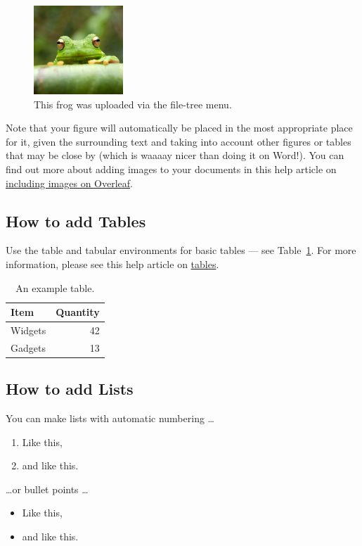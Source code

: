 \documentclass{article}
\begin{document}
\begin{figure}[tb]
\centering
\includegraphics[width=0.3\textwidth]{frog.jpg}
\caption{\label{fig:frog}This frog was uploaded via the file-tree menu.}
\end{figure}

Note that your figure will automatically be placed in the most appropriate place for it, given the surrounding text and taking into account other figures or tables that may be close by (which is waaaay nicer than doing it on Word!). You can find out more about adding images to your documents in this help article on \href{https://www.overleaf.com/learn/how-to/Including_images_on_Overleaf}{including images on Overleaf}.



\subsection{How to add Tables}

Use the table and tabular environments for basic tables --- see Table~\ref{tab:widgets}. For more information, please see this help article on \href{https://www.overleaf.com/learn/latex/tables}{tables}. 

\begin{table}[tb]
\centering
\begin{tabular}{l|r}
Item & Quantity \\\hline
Widgets & 42 \\
Gadgets & 13
\end{tabular}
\caption{\label{tab:widgets}An example table.}
\end{table}


\subsection{How to add Lists}

You can make lists with automatic numbering \dots

\begin{enumerate}
\item Like this,
\item and like this.
\end{enumerate}
\dots or bullet points \dots
\begin{itemize}
\item Like this,
\item and like this.
\end{itemize}
\end{document}
